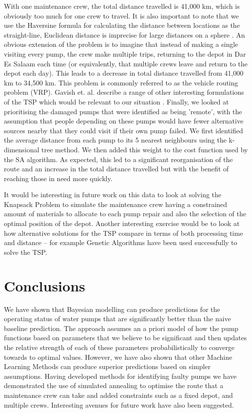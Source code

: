 \documentclass{article} %
\begin{document}
\begin{multicols}{2}
With one maintenance crew, the total distance travelled is 41,000 km, which is obviously too much for one crew to travel. It is also important to note that we use the Haversine formula for calculating the distance between locations as the straight-line, Euclidean distance is imprecise for large distances on a sphere \cite{Sinnot1983}. An obvious extension of the problem is to imagine that instead of making a single visiting every pump, the crew make multiple trips, returning to the depot in Dar Es Salaam each time (or equivalently, that multiple crews leave and return to the depot each day). This leads to a decrease in total distance travelled from 41,000 km to 34,500 km. This problem is commonly referred to as the vehicle routing problem (VRP). Gavish et. al. describe a range of other interesting formulations of the TSP which would be relevant to our situation \cite{Gavish1978}. Finally, we looked at prioritising the damaged pumps that were identified as being 'remote', with the assumption that people depending on these pumps would have fewer alternative sources nearby that they could visit if their own pump failed. We first identified the average distance from each pump to its 5 nearest neighbours using the k-dimensional tree method. We then added this weight to the cost function used by the SA algorithm. As expected, this led to a significant reorganisation of the route and an increase in the total distance travelled but with the benefit of reaching those in need more quickly.

It would be interesting in future work on this data to look at solving the Knapsack Problem to simulate the maintenance crew having a constrained amount of materials to allocate to each pump repair and also the selection of the optimal position of the depot. Another interesting exercise would be to look at how alternative solutions for the TSP compare in terms of both processing time and distance -- for example Genetic Algorithms have been used successfully to solve the TSP.

\section*{Conclusions}

We have shown that Bayesian modelling can produce predictions for the operating status of water pumps that are significantly better than the naive baseline prediction. The approach assumes an a priori model of how the pump functions based on parameters that we believe to be significant and then updates the relative strength of each of these parameters probabilistically to converge towards to optimal values. However, we have also shown that other Machine Learning Methods can produce superior predictions based on simpler assumptions. Having developed methods for identifying faulty pumps we have demonstrated the use of simulated annealing to optimise the route that a maintenance crew can take and added constraints such as a fixed depot, and multiple crews. Interesting avenues for future work have also been suggested. 



\end{multicols}
\end{document}
